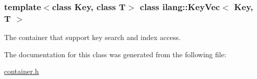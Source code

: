 \subsubsection*{template$<$class Key, class T$>$\newline
class ilang\+::\+Key\+Vec$<$ Key, T $>$}

The container that support key search and index access. 

The documentation for this class was generated from the following file\+:\begin{DoxyCompactItemize}
\item 
\mbox{\hyperlink{container_8h}{container.\+h}}\end{DoxyCompactItemize}
